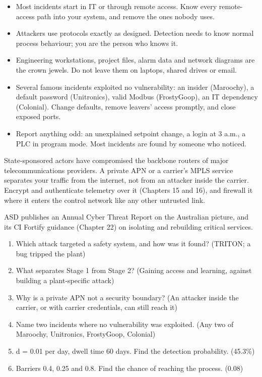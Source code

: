 \begin{itemize}
\item Most incidents start in IT or through remote access. Know every remote-access path into your system, and remove the ones nobody uses.
\item Attackers use protocols exactly as designed. Detection needs to know normal process behaviour; you are the person who knows it.
\item Engineering workstations, project files, alarm data and network diagrams are the crown jewels. Do not leave them on laptops, shared drives or email.
\item Several famous incidents exploited no vulnerability: an insider (Maroochy), a default password (Unitronics), valid Modbus (FrostyGoop), an IT dependency (Colonial). Change defaults, remove leavers' access promptly, and close exposed ports.
\item Report anything odd: an unexplained setpoint change, a login at 3 a.m., a PLC in program mode. Most incidents are found by someone who noticed.
\end{itemize}

 State-sponsored actors have compromised the backbone routers of major telecommunications providers. A private APN or a carrier's MPLS service separates your traffic from the internet, not from an attacker inside the carrier. Encrypt and authenticate telemetry over it (Chapters 15 and 16), and firewall it where it enters the control network like any other untrusted link.

ASD publishes an Annual Cyber Threat Report on the Australian picture, and its CI Fortify guidance (Chapter 22) on isolating and rebuilding critical services.


\begin{enumerate}
\item Which attack targeted a safety system, and how was it found? (TRITON; a bug tripped the plant)
\item What separates Stage 1 from Stage 2? (Gaining access and learning, against building a plant-specific attack)
\item Why is a private APN not a security boundary? (An attacker inside the carrier, or with carrier credentials, can still reach it)
\item Name two incidents where no vulnerability was exploited. (Any two of Maroochy, Unitronics, FrostyGoop, Colonial)
\item d = 0.01 per day, dwell time 60 days. Find the detection probability. (45.3\%)
\item Barriers 0.4, 0.25 and 0.8. Find the chance of reaching the process. (0.08)
\end{enumerate}
